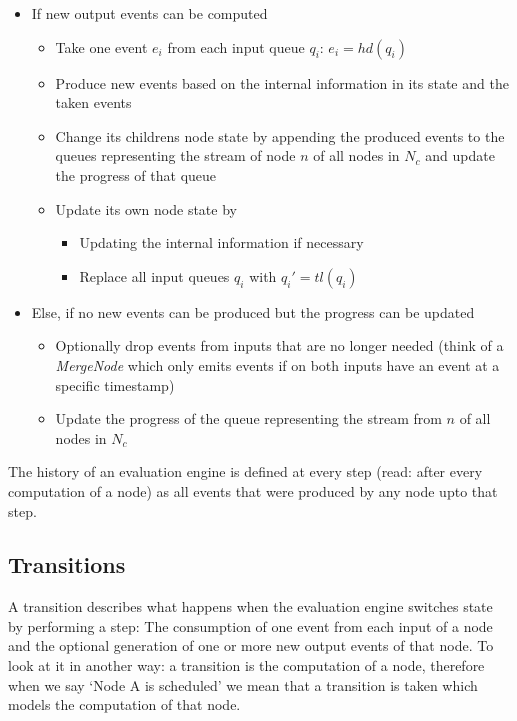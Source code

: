 \begin{itemize}
  \item If new output events can be computed
    \begin{itemize}
      \item Take one event \(e_i\) from each input queue \(q_i\): \(e_i = hd(q_i)\)
      \item Produce new events based on the internal information in its state and the taken events
      \item Change its childrens node state by appending the produced events to the queues representing the stream of node \(n\) of all nodes in \(N_c\) and update the progress of that queue
      \item Update its own node state by
        \begin{itemize}
          \item Updating the internal information if necessary
          \item Replace all input queues \(q_i\) with \(q_i' = tl(q_i)\)
        \end{itemize}
    \end{itemize}
    \item Else, if no new events can be produced but the progress can be updated
    \begin{itemize}
      \item Optionally drop events from inputs that are no longer needed (think of a \emph{MergeNode} which only emits events if on both inputs have an event at a specific timestamp)
      \item Update the progress of the queue representing the stream from \(n\) of all nodes in \(N_c\)
    \end{itemize}
\end{itemize}

The history of an evaluation engine is defined at every step (read: after every computation of a node) as all events that were produced by any node upto that step.

\subsection{Transitions}
\label{sec:concepts:def:transitions}

A transition describes what happens when the evaluation engine switches state by performing a step:
The consumption of one event from each input of a node and the optional generation of one or more new output events of that node.
To look at it in another way: a transition is the computation of a node, therefore when we say `Node A is scheduled' we mean that a transition is taken which models the computation of that node.

